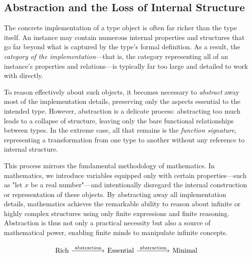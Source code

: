 \subsection{Abstraction and the Loss of Internal Structure}

The concrete implementation of a type object is often far richer than the type itself. An instance may contain numerous internal properties and structures that go far beyond what is captured by the type's formal definition. As a result, the \emph{category of the implementation}—that is, the category representing all of an instance's properties and relations—is typically far too large and detailed to work with directly.

To reason effectively about such objects, it becomes necessary to \emph{abstract} away most of the implementation details, preserving only the aspects essential to the intended type. However, abstraction is a delicate process: abstracting too much leads to a collapse of structure, leaving only the bare functional relationships between types. In the extreme case, all that remains is the \emph{function signature}, representing a transformation from one type to another without any reference to internal structure.

This process mirrors the fundamental methodology of mathematics. In mathematics, we introduce variables equipped only with certain properties—such as "let \( x \) be a real number"—and intentionally disregard the internal construction or representation of these objects. By abstracting away all implementation details, mathematics achieves the remarkable ability to reason about infinite or highly complex structures using only finite expressions and finite reasoning. Abstraction is thus not only a practical necessity but also a source of mathematical power, enabling finite minds to manipulate infinite concepts.

\[
\begin{tikzcd}[column sep=huge]
\text{Rich} \arrow[r, "\text{abstraction}"] & \text{Essential} \arrow[r, "\text{abstraction}"] & \text{Minimal}
\end{tikzcd}
\]